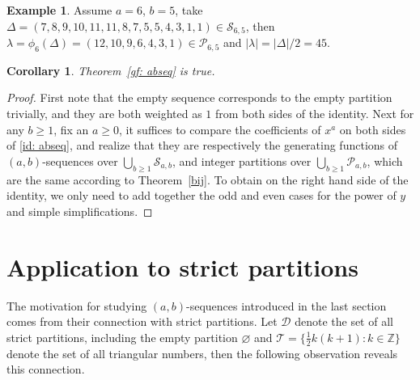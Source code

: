 \documentclass[12pt,reqno]{amsart}
\numberwithin{equation}{section}
\theoremstyle{plain}
\newtheorem{corollary}[theorem]{Corollary}
\theoremstyle{definition}
\newtheorem{example}[theorem]{Example}
\newcommand{\s}{\mathcal{S}}
\newcommand{\p}{\mathcal{P}}
\newcommand{\T}{\mathcal{T}}
\newcommand{\D}{\mathcal{D}}
\begin{document}
\begin{example}
Assume $a=6$, $b=5$, take $\Delta=(7, 8, 9, 10, 11, 11, 8, 7, 5 ,5, 4, 3, 1, 1)\in\s_{6,5}$, then $\lambda=\phi_6(\Delta)=(12, 10, 9, 6, 4, 3, 1)\in\mathcal{P}_{6,5}$ and $|\lambda|=|\Delta|/2=45$.
\end{example}

\begin{corollary}
Theorem~\ref{gf: abseq} is true.
\end{corollary}
\begin{proof}
First note that the empty sequence corresponds to the empty partition trivially, and they are both weighted as $1$ from both sides of the identity. Next for any $b\ge 1$, fix an $a\ge 0$, it suffices to compare the coefficients of $x^a$ on both sides of \eqref{id: abseq}, and realize that they are respectively the generating functions of $(a,b)$-sequences over $\bigcup_{b\ge 1}\s_{a,b}$, and integer partitions over $\bigcup_{b\ge 1}\p_{a,b}$, which are the same according to Theorem~\ref{bij}. To obtain on the right hand side of the identity, we only need to add together the odd and even cases for the power of $y$ and simple simplifications.
\end{proof}





\section{Application to strict partitions}\label{sec: application}

The motivation for studying $(a,b)$-sequences introduced in the last section comes from their connection with strict partitions. Let $\D$ denote the set of all strict partitions, including the empty partition $\varnothing$ and $\T=\{\frac{1}{2}k(k+1): k\in\mathbb{Z}\}$ denote the set of all triangular numbers, then the following observation reveals this connection.
\end{document}
